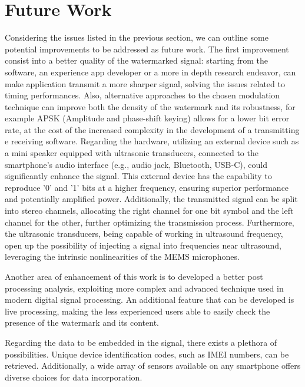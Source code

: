 \section{Future Work}
Considering the issues listed in the previous section, we can outline some potential improvements to be addressed as future work. 
The first improvement consist into a better quality of the watermarked signal: starting from the software, an experience app developer or a more in depth research endeavor, can make application transmit a more sharper signal, solving the issues related to timing performances. Also, alternative approaches to the chosen modulation technique can improve both the density of the watermark and its robustness, for example APSK (Amplitude and phase-shift keying) allows for a lower bit error rate, at the cost of the increased complexity in the development of a transmitting e receiving software.
Regarding the hardware, utilizing an external device such as a mini speaker equipped with ultrasonic transducers, connected to the smartphone's audio interface (e.g., audio jack, Bluetooth, USB-C), could significantly enhance the signal. This external device has the capability to reproduce '0' and '1' bits at a higher frequency, ensuring superior performance and potentially amplified power. Additionally, the transmitted signal can be split into stereo channels, allocating the right channel for one bit symbol and the left channel for the other, further optimizing the transmission process. Furthermore, the ultrasonic transducers, being capable of working in ultrasound frequency, open up the possibility of injecting a signal into frequencies near ultrasound, leveraging the intrinsic nonlinearities of the MEMS microphones.

Another area of enhancement of this work is to developed a better post processing analysis, exploiting more complex and advanced technique used in modern digital signal processing.
An additional feature that can be developed is live processing, making the less experienced users able to easily check the presence of the watermark and its content.

Regarding the data to be embedded in the signal, there exists a plethora of possibilities. Unique device identification codes, such as IMEI numbers, can be retrieved. Additionally, a wide array of sensors available on any smartphone offers diverse choices for data incorporation.